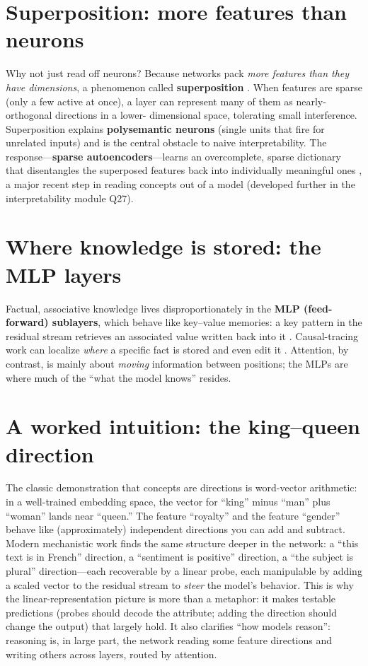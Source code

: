 \documentclass[11pt]{article}
\begin{document}
\section{Superposition: more features than neurons}
Why not just read off neurons? Because networks pack \emph{more features than they have dimensions}, a
phenomenon called \textbf{superposition} \citep{elhage2022superposition}. When features are sparse (only a
few active at once), a layer can represent many of them as nearly-orthogonal directions in a lower-
dimensional space, tolerating small interference. Superposition explains \textbf{polysemantic neurons}
(single units that fire for unrelated inputs) and is the central obstacle to naive interpretability. The
response---\textbf{sparse autoencoders}---learns an overcomplete, sparse dictionary that disentangles the
superposed features back into individually meaningful ones \citep{bricken2023monosemanticity}, a major
recent step in reading concepts out of a model (developed further in the interpretability module Q27).

\section{Where knowledge is stored: the MLP layers}
Factual, associative knowledge lives disproportionately in the \textbf{MLP (feed-forward) sublayers},
which behave like key--value memories: a key pattern in the residual stream retrieves an associated value
written back into it \citep{geva2021kv}. Causal-tracing work can localize \emph{where} a specific fact is
stored and even edit it \citep{meng2022rome}. Attention, by contrast, is mainly about \emph{moving}
information between positions; the MLPs are where much of the ``what the model knows'' resides.

\section{A worked intuition: the king--queen direction}
The classic demonstration that concepts are directions is word-vector arithmetic: in a well-trained
embedding space, the vector for ``king'' minus ``man'' plus ``woman'' lands near ``queen.'' The feature
``royalty'' and the feature ``gender'' behave like (approximately) independent directions you can add and
subtract. Modern mechanistic work finds the same structure deeper in the network: a ``this text is in
French'' direction, a ``sentiment is positive'' direction, a ``the subject is plural'' direction---each
recoverable by a linear probe, each manipulable by adding a scaled vector to the residual stream to
\emph{steer} the model's behavior. This is why the linear-representation picture is more than a metaphor:
it makes testable predictions (probes should decode the attribute; adding the direction should change the
output) that largely hold. It also clarifies ``how models reason'': reasoning is, in large part, the
network reading some feature directions and writing others across layers, routed by attention.
\end{document}
